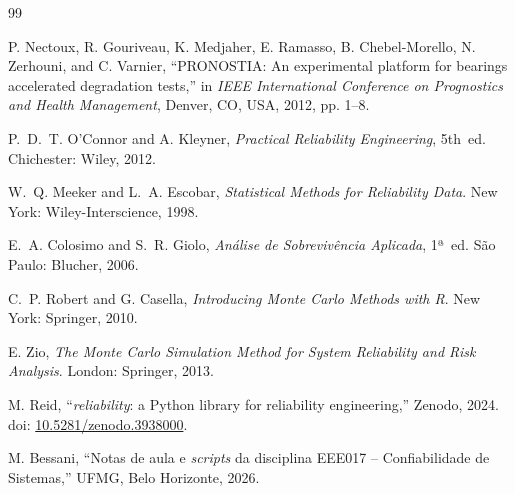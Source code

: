 \documentclass[conference]{IEEEtran}
\begin{document}
\begin{thebibliography}{99}

P. Nectoux, R. Gouriveau, K. Medjaher, E. Ramasso, B. Chebel-Morello,
N. Zerhouni, and C. Varnier,
``PRONOSTIA: An experimental platform for bearings accelerated degradation tests,''
in \textit{IEEE International Conference on Prognostics and Health Management},
Denver, CO, USA, 2012, pp. 1--8.

P.~D.~T. O'Connor and A. Kleyner,
\textit{Practical Reliability Engineering}, 5th~ed.
Chichester: Wiley, 2012.

W.~Q. Meeker and L.~A. Escobar,
\textit{Statistical Methods for Reliability Data}.
New York: Wiley-Interscience, 1998.

E.~A. Colosimo and S.~R. Giolo,
\textit{Análise de Sobrevivência Aplicada}, 1ª~ed.
São Paulo: Blucher, 2006.

C.~P. Robert and G. Casella,
\textit{Introducing Monte Carlo Methods with R}.
New York: Springer, 2010.

E. Zio,
\textit{The Monte Carlo Simulation Method for System Reliability and Risk
Analysis}. London: Springer, 2013.

M. Reid, ``\textit{reliability}: a Python library for reliability
engineering,'' Zenodo, 2024.
doi: \href{https://doi.org/10.5281/zenodo.3938000}{10.5281/zenodo.3938000}.

M. Bessani,
``Notas de aula e \textit{scripts} da disciplina EEE017 -- Confiabilidade de
Sistemas,'' UFMG, Belo Horizonte, 2026.

\end{thebibliography}
\end{document}
